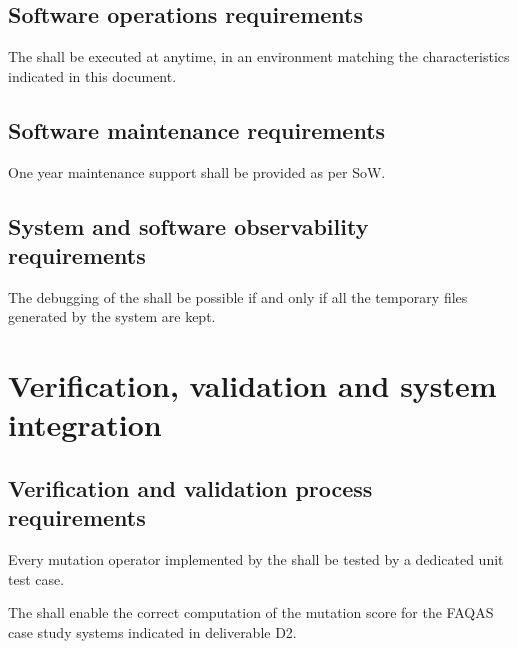 \section{Software operations requirements}

\RQ{} The \FAQAS shall be executed at anytime,
in an environment matching the characteristics indicated in this document.

\section{Software maintenance requirements}

\RQ{} One year maintenance support shall be provided as per SoW.

\section{System and software observability requirements}

\RQ{} The debugging of the \FAQAS shall be possible if and only if
all the temporary files generated by the system are kept.

\chapter{Verification, validation and system integration}
 \section{Verification and validation process requirements}

\RQ{} Every mutation operator implemented by the \FAQAS shall be tested by a dedicated unit test case.




 \RQ{} The \FAQAS shall enable the correct computation of the mutation score for the FAQAS case study systems indicated in deliverable D2.
 
 
